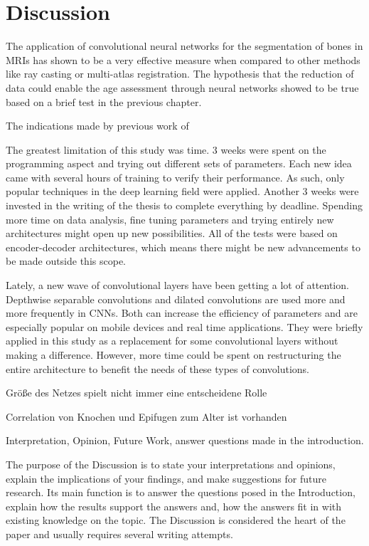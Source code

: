 \section{Discussion}

The application of convolutional neural networks for the segmentation of bones in MRIs has shown to be a very effective measure when compared to other methods like ray casting or multi-atlas registration. The hypothesis that the reduction of data could enable the age assessment through neural networks showed to be true based on a brief test in the previous chapter. 


The indications made by previous work of 

The greatest limitation of this study was time. 3 weeks were spent on the programming aspect and trying out different sets of parameters. Each new idea came with several hours of training to verify their performance. As such, only popular techniques in the deep learning field were applied. Another 3 weeks were invested in the writing of the thesis to complete everything by deadline. Spending more time on data analysis, fine tuning parameters and trying entirely new architectures might open up new possibilities. All of the tests were based on encoder-decoder architectures, which means there might be new advancements to be made outside this scope.

Lately, a new wave of convolutional layers have been getting a lot of attention. Depthwise separable convolutions and dilated convolutions are used more and more frequently in CNNs. Both can increase the efficiency of parameters and are especially popular on mobile devices and real time applications. They were briefly applied in this study as a replacement for some convolutional layers without making a difference. However, more time could be spent on restructuring the entire architecture to benefit the needs of these types of convolutions.





Größe des Netzes spielt nicht immer eine entscheidene Rolle

Correlation von Knochen und Epifugen zum Alter ist vorhanden


Interpretation, Opinion, Future Work, answer questions made in the introduction.

The purpose of the Discussion is to state your interpretations and opinions, explain the implications of your findings, and make suggestions for future research. Its main function is to answer the questions posed in the Introduction, explain how the results support the answers and, how the answers fit in with existing knowledge on the topic. The Discussion is considered the heart of the paper and usually requires several writing attempts. 



\newpage